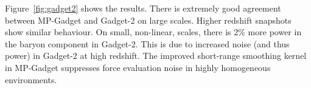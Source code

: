 \documentclass[a4paper,11pt]{article}
\begin{document}
Figure~\ref{fig:gadget2} shows the results. There is extremely good agreement between MP-Gadget and Gadget-2 on large scales.  Higher redshift snapshots show similar behaviour. On small, non-linear, scales, there is $2\%$ more power in the baryon component in Gadget-2. This is due to increased noise (and thus power) in Gadget-2 at high redshift. The improved short-range smoothing kernel in MP-Gadget suppresses force evaluation noise in highly homogeneous environments.



\end{document}
